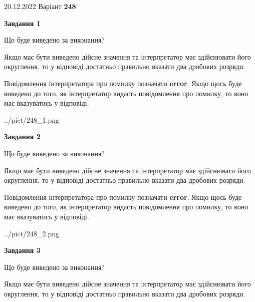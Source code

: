 \documentclass[12pt, ukrainian]{article}
\begin{document}
{20.12.2022 Варіант \No \textbf { 248 }\par}
{
\begin {Large}

{\begin {center}\textbf{Завдання 1}\end {center}}\par
Що буде виведено за виконання? \par

Якщо має бути виведено дійсне значення та інтерпретатор має здійснювати його округлення, 
то у відповіді достатньо правильно вказати два дробових розряди.

Повідомлення інтерпретатора про помилку позначати \textbf{error}.
Якщо щось буде виведено до того, як інтерпретатор видасть повідомлення про помилку, 
то воно має вказуватись у відповіді. \par

\begin{center}
	{../pict/248_1.png}
\end{center}
\newpage

{\begin {center}\textbf{Завдання 2}\end {center}}\par
Що буде виведено за виконання? \par

Якщо має бути виведено дійсне значення та інтерпретатор має здійснювати його округлення, 
то у відповіді достатньо правильно вказати два дробових розряди.

Повідомлення інтерпретатора про помилку позначати \textbf{error}.
Якщо щось буде виведено до того, як інтерпретатор видасть повідомлення про помилку, 
то воно має вказуватись у відповіді. \par

\begin{center}
	{../pict/248_2.png}
\end{center}
\newpage

{\begin {center}\textbf{Завдання 3}\end {center}}\par
Що буде виведено за виконання? \par

Якщо має бути виведено дійсне значення та інтерпретатор має здійснювати його округлення, 
то у відповіді достатньо правильно вказати два дробових розряди.


\end{Large}}
\end{document}

